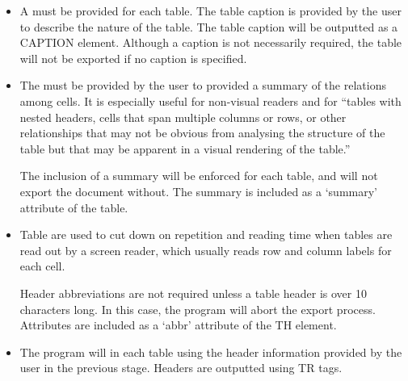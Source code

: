 \begin{itemize}

\item A  must be provided for each table. The table
caption is provided by the user to describe the nature of the table.  The table
caption will be outputted as a CAPTION element. Although a caption is not
necessarily required, the table will not be exported if no caption is specified.

\item The  must be provided by the user to provided a summary
of the relations among cells. It is especially useful for non-visual readers
and for ``tables with nested headers, cells that span multiple columns or rows,
or other relationships that may not be obvious from analysing the structure of
the table but that may be apparent in a visual rendering of the
table.''~\cite{w3c:wcagtechs}

The inclusion of a summary will be enforced for each table, and will not export
the document without. The summary is included as a `summary'  attribute of the
table.

\item Table  are used to cut down on repetition
and reading time when tables are read out by a screen reader, which usually
reads row and column labels for each cell. 

Header abbreviations are not required unless a table header is over 10
characters long. In this case, the program will abort the export process.
Attributes are included as a `abbr' attribute of the TH element.

\item The program will  in each table using the
header information provided by the user in the previous stage. Headers are
outputted using TR tags.



\end{itemize}
